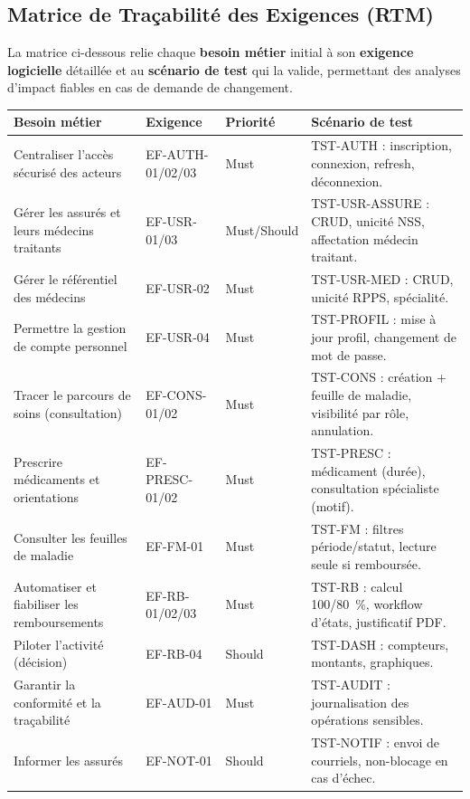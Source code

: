 \documentclass[11pt,a4paper]{article}
\begin{document}
\subsection{Matrice de Traçabilité des Exigences (RTM)}
La matrice ci-dessous relie chaque \textbf{besoin métier} initial à son
\textbf{exigence logicielle} détaillée et au \textbf{scénario de test} qui la valide,
permettant des analyses d'impact fiables en cas de demande de changement.

\begin{center}
\begin{longtable}{|L{3.6cm}|L{2.4cm}|L{2.2cm}|L{4.6cm}|}
\hline
{}\textbf{Besoin métier} & \textbf{Exigence} & \textbf{Priorité} & \textbf{Scénario de test}\\\hline
\endhead
Centraliser l'accès sécurisé des acteurs & EF-AUTH-01/02/03 & Must & TST-AUTH : inscription, connexion, refresh, déconnexion.\\\hline
Gérer les assurés et leurs médecins traitants & EF-USR-01/03 & Must/Should & TST-USR-ASSURE : CRUD, unicité NSS, affectation médecin traitant.\\\hline
Gérer le référentiel des médecins & EF-USR-02 & Must & TST-USR-MED : CRUD, unicité RPPS, spécialité.\\\hline
Permettre la gestion de compte personnel & EF-USR-04 & Must & TST-PROFIL : mise à jour profil, changement de mot de passe.\\\hline
Tracer le parcours de soins (consultation) & EF-CONS-01/02 & Must & TST-CONS : création + feuille de maladie, visibilité par rôle, annulation.\\\hline
Prescrire médicaments et orientations & EF-PRESC-01/02 & Must & TST-PRESC : médicament (durée), consultation spécialiste (motif).\\\hline
Consulter les feuilles de maladie & EF-FM-01 & Must & TST-FM : filtres période/statut, lecture seule si remboursée.\\\hline
Automatiser et fiabiliser les remboursements & EF-RB-01/02/03 & Must & TST-RB : calcul 100/80~\%, workflow d'états, justificatif PDF.\\\hline
Piloter l'activité (décision) & EF-RB-04 & Should & TST-DASH : compteurs, montants, graphiques.\\\hline
Garantir la conformité et la traçabilité & EF-AUD-01 & Must & TST-AUDIT : journalisation des opérations sensibles.\\\hline
Informer les assurés & EF-NOT-01 & Should & TST-NOTIF : envoi de courriels, non-blocage en cas d'échec.\\\hline
\end{longtable}
\end{center}
\end{document}
